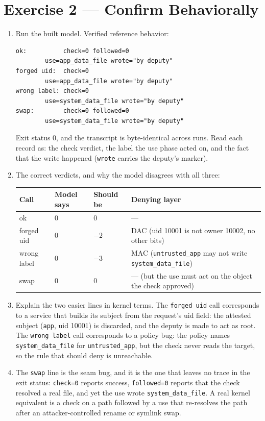 \documentclass[12pt]{Training}
\begin{document}
\section*{Exercise 2 --- Confirm Behaviorally}
\begin{enumerate}
    \item Run the built model. Verified reference behavior:
    \begin{lstlisting}
ok:          check=0 followed=0
        use=app_data_file wrote="by deputy"
forged uid:  check=0
        use=app_data_file wrote="by deputy"
wrong label: check=0
        use=system_data_file wrote="by deputy"
swap:        check=0 followed=0
        use=system_data_file wrote="by deputy"
    \end{lstlisting}
        Exit status 0, and the transcript is byte-identical across runs. Read each record as: the check verdict, the label the use phase acted on, and the fact that the write happened (\lstinline{wrote} carries the deputy's marker).
    \item The correct verdicts, and why the model disagrees with all three:
    \begin{center}
    \footnotesize
    \begin{tabular}{@{}llll@{}}
    \toprule
    Call & Model says & Should be & Denying layer \\
    \midrule
    ok & 0 & 0 & --- \\
    forged uid & 0 & $-2$ & DAC (uid 10001 is not owner 10002, no other bits) \\
    wrong label & 0 & $-3$ & MAC (\lstinline|untrusted_app| may not write \lstinline|system_data_file|) \\
    swap & 0 & 0 & --- (but the use must act on the object the check approved) \\
    \bottomrule
    \end{tabular}
    \end{center}
    \item Explain the two easier lines in kernel terms. The \lstinline{forged uid} call corresponds to a service that builds its subject from the request's uid field: the attested subject (\lstinline{app}, uid 10001) is discarded, and the deputy is made to act as root. The \lstinline{wrong label} call corresponds to a policy bug: the policy names \lstinline{system_data_file} for \lstinline{untrusted_app}, but the check never reads the target, so the rule that should deny is unreachable.
    \item The \lstinline{swap} line is the seam bug, and it is the one that leaves no trace in the exit status: \lstinline{check=0} reports success, \lstinline{followed=0} reports that the check resolved a real file, and yet the use wrote \lstinline{system_data_file}. A real kernel equivalent is a check on a path followed by a use that re-resolves the path after an attacker-controlled rename or symlink swap.

\end{enumerate}
\end{document}
